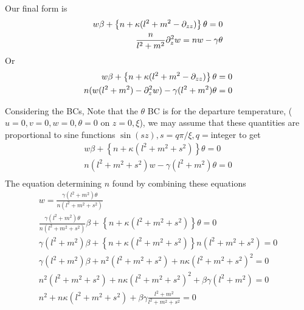 \documentclass[11pt]{article}
\begin{document}
Our final form is
\begin{equation}\begin{aligned}
w \beta + \left\{n + \kappa (l^2 +m^2-\partial_{zz}) \right\} \theta = 0 \\
\frac{n}{l^2 + m^2} \partial_z^2 w = n w - \gamma \theta \\
\end{aligned} \end{equation}
Or
\begin{equation}\begin{aligned}
w \beta + \left\{n + \kappa (l^2 +m^2-\partial_{zz}) \right\} \theta = 0 \\
n (w (l^2 + m^2) - \partial_z^2 w) - \gamma (l^2 + m^2) \theta = 0 \\
\end{aligned} \end{equation}

Considering the BCs, Note that the $\theta$ BC is for the departure temperature, ($u=0,v=0,w=0,\theta=0$ on $z=0,\xi$), we may assume that these quantities are proportional to sine functions $\sin(sz), s=q\pi/\xi, q=$integer to get
\begin{equation}\begin{aligned}
w \beta + \left\{n + \kappa (l^2 +m^2+s^2) \right\} \theta = 0 \\
n (l^2 + m^2 + s^2) w - \gamma (l^2 + m^2) \theta = 0 \\
\end{aligned} \end{equation}
The equation determining $n$ found by combining these equations
\begin{equation}\begin{aligned}
w = \frac{\gamma (l^2 + m^2) \theta}{n (l^2 + m^2 + s^2)} \\
\frac{\gamma (l^2 + m^2) \theta}{n (l^2 + m^2 + s^2)} \beta + \left\{n + \kappa (l^2 +m^2+s^2) \right\} \theta = 0 \\
\gamma (l^2 + m^2) \beta + \left\{n + \kappa (l^2 +m^2+s^2) \right\} n (l^2 + m^2 + s^2) = 0 \\
\gamma (l^2 + m^2) \beta + n^2 (l^2 + m^2 + s^2) + n \kappa (l^2 +m^2+s^2)^2 = 0 \\
n^2 (l^2 + m^2 + s^2) + n \kappa (l^2 +m^2+s^2)^2 + \beta \gamma (l^2 + m^2) = 0 \\
n^2 + n \kappa (l^2 +m^2+s^2) + \beta \gamma \frac{l^2 + m^2}{l^2 + m^2 + s^2} = 0 \\
\end{aligned} \end{equation}
\end{document}
